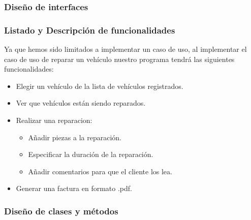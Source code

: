 \documentclass{article}
\begin{document}
\subsubsection{Diseño de interfaces}
\subsubsection{Listado y Descripción de funcionalidades}
Ya que hemos sido limitados a implementar un caso de uso, al implementar el caso de uso de reparar un vehículo nuestro programa tendrá las siguientes funcionalidades:\\
\begin{itemize}
  \item Elegir un vehículo de la lista de vehículos registrados.
  \item Ver que vehículos están siendo reparados.
  \item Realizar una reparacion: \begin{itemize}
    \item Añadir piezas a la reparación.
    \item Especificar la duración de la reparación.
    \item Añadir comentarios para que el cliente los lea.
  \end{itemize}
  \item Generar una factura en formato .pdf.
\end{itemize}
\subsubsection{Diseño de clases y métodos}
\end{document}
